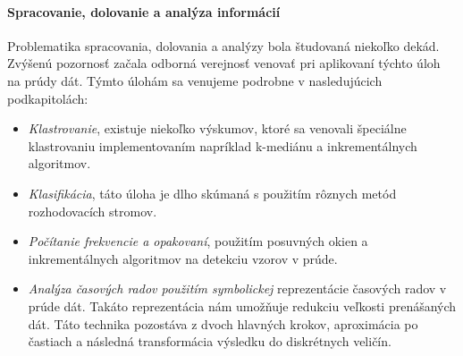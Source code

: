 \paragraph{Spracovanie, dolovanie a analýza informácií} 
Problematika spracovania, dolovania a analýzy bola študovaná niekoľko dekád. Zvýšenú pozornosť začala odborná verejnosť venovať pri aplikovaní týchto úloh na prúdy dát. Týmto úlohám sa venujeme podrobne v nasledujúcich podkapitolách:
\begin{itemize}
	\item \textit{Klastrovanie}, existuje niekoľko výskumov, ktoré sa venovali špeciálne klastrovaniu implementovaním napríklad k-mediánu a inkrementálnych algoritmov.
	\item \textit{Klasifikácia}, táto úloha je dlho skúmaná s použitím rôznych metód rozhodovacích stromov.
	\item \textit{Počítanie frekvencie a opakovaní}, použitím posuvných okien a inkrementálnych algoritmov na detekciu vzorov v prúde.
	\item \textit{Analýza časových radov použitím symbolickej} reprezentácie časových radov v prúde dát. Takáto reprezentácia nám umožňuje redukciu veľkosti prenášaných dát. Táto technika pozostáva z dvoch hlavných krokov, aproximácia po častiach a následná transformácia výsledku do diskrétnych veličín.
\end{itemize}


